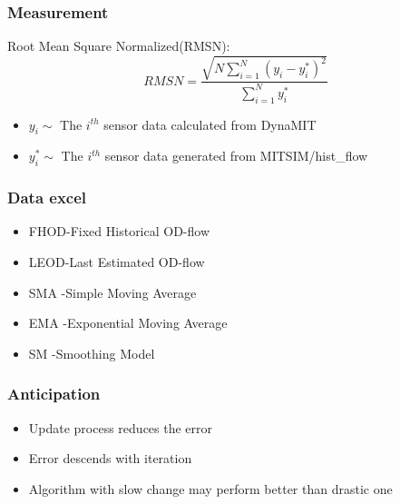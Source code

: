 \documentclass[12pt]{beamer}
\begin{document}
\begin{frame}
\frametitle{Measurement}
Root Mean Square Normalized(RMSN):
\[ RMSN=\frac{\sqrt{N\sum_{i=1}^{N} (y_i-y_i^*)^2}}{\sum_{i=1}^{N}y_i^*} \]

\begin{itemize}
\item $y_i\sim$ The $i^{th}$ sensor data calculated from DynaMIT
\item $y_i^*\sim$ The $i^{th}$ sensor data generated from MITSIM/hist\_flow 
\end{itemize}
\end{frame}

\begin{frame}
\frametitle{Data excel}
\begin{itemize}
\item FHOD-Fixed Historical OD-flow
\item LEOD-Last Estimated OD-flow
\item SMA -Simple Moving Average
\item EMA -Exponential Moving Average
\item SM  -Smoothing Model 
\end{itemize}

\begin{table}
\begin{center}
\end{center}
\end{table}
\end{frame}

\begin{frame}
\frametitle{Anticipation}
\begin{itemize}
\item Update process reduces the error
\item Error descends with iteration
\item Algorithm with slow change may perform better than drastic one
\end{itemize}
\end{frame}
\end{document}
